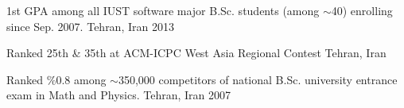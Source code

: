 

\begin{cvhonors}

  \cvhonor
    {1st GPA} %
    {among all IUST software major B.Sc. students (among $\sim$40) enrolling since Sep. 2007.} %
    {Tehran, Iran} %
    {2013} %

  \cvhonor
    {Ranked 25th \& 35th} %
    {at ACM-ICPC West Asia Regional Contest} %
    {Tehran, Iran} %
    {} %

  \cvhonor
    {Ranked \%0.8} %
    {among $\sim$350,000 competitors of national B.Sc. university entrance exam in Math and Physics.} %
    {Tehran, Iran} %
    {2007} %

\end{cvhonors}